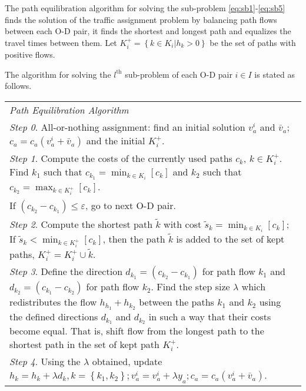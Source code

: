 The path equilibration algorithm for solving the sub-problem \eqref{eq:sb1}-\eqref{eq:sb5} 
finds the solution of the traffic assignment problem by balancing path flows between each O-D pair,
it finds the shortest and longest path and equalizes the travel times between them.
Let $K_i^{+} = \left\{ k \in K_i | h_k > 0 \right\}$ be the set of paths with positive flows.

The algorithm for solving the $l^\text{th}$ sub-problem of each O-D pair $i \in I$ is stated as follows.
\begin{table}[H]
    \begin{tabular}{ m{} }
        \hspace{-.5cm}\emph{Path Equilibration Algorithm} \citep{Florian} \\
        \emph{Step 0}. All-or-nothing assignment: find an initial solution $v_a^i$ and $\bar{v}_a$; $c_a = c_a(v_a^i+\bar{v}_a)$ and the initial $K_i^+$.\\
        \emph{Step 1}. Compute the costs of the currently used paths $c_k$, $k \in K_i^+$. Find $k_1$ such that $c_{k_1} = \displaystyle \min_{k \in K_i} \left[ c_k \right]$ and $k_2$ such that $c_{k_2} = \displaystyle \max_{k \in K_i^+} \left[c_k \right]$.\\
        If $(c_{k_2} - c_{k_1}) \leq \varepsilon$, go to next O-D pair.\\
        \emph{Step 2}. 
        Compute the shortest path $\tilde{k}$ with cost $\tilde{s}_k = \displaystyle \min_{k \in K_i} \left[ c_k \right]$;
        If $\tilde{s}_k < \displaystyle \min_{k \in K_i^+} \left[ c_k \right]$, then the path $\tilde{k}$ is added to the set of kept paths, $K_i^+ = K_i^+ \cup \tilde{k}$.\\
        \emph{Step 3}.  Define the direction $d_{k_1} = (c_{k_2} - c_{k_1})$ for path flow $k_1$ and $d_{k_2} = (c_{k_1} - c_{k_2})$ for path flow $k_2$.
         Find the step size $\lambda$ which redistributes the flow $h_{h_1} + h_{k_2}$ between the paths $k_1$ and $k_2$ using the defined directions $d_{k_1}$ and $d_{k_2}$ in such a way that their costs become equal. That is, shift flow from the longest path to the shortest path in the set of kept path $K_i^+$. \\
        \emph{Step 4}. Using the $\lambda$ obtained, update $h_k = h_k + \lambda d_k, k = \left\{ k_1, k_2 \right\}; v_a^i = v_a^i + \lambda y_a; c_a = c_a(v_a^i + \bar{v}_a)$. \\
    \end{tabular}
\end{table}

